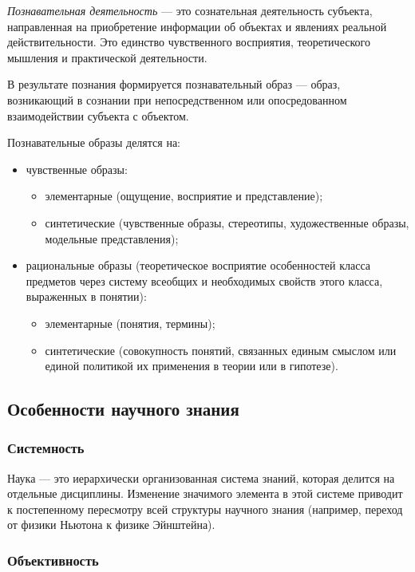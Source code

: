 \textit{Познавательная
деятельность} --- это сознательная деятельность субъекта, направленная на
приобретение информации об объектах и явлениях реальной действительности. Это
единство чувственного восприятия, теоретического мышления и практической
деятельности.  

В результате познания формируется
познавательный образ --- образ, возникающий в сознании при непосредственном или
опосредованном взаимодействии субъекта с объектом.  

Познавательные образы делятся на: 

\begin{itemize}
    \item чувственные образы:
    \begin{itemize}
        \item элементарные (ощущение, восприятие и представление);
        \item синтетические (чувственные образы, стереотипы, художественные образы, модельные представления);
    \end{itemize}
    \item рациональные образы (теоретическое восприятие особенностей класса предметов 
через систему всеобщих и необходимых свойств этого класса, выраженных
в понятии):
    \begin{itemize}
        \item элементарные (понятия, термины);
        \item синтетические (совокупность понятий, связанных 
единым смыслом или единой политикой их применения в теории или в гипотезе).
    \end{itemize}
\end{itemize}

\subsection{Особенности научного знания} 

\subsubsection{Системность} 

Наука --- это иерархически организованная система знаний, которая делится на отдельные дисциплины. Изменение значимого элемента в этой системе приводит к постепенному пересмотру всей структуры научного знания (например, переход от физики Ньютона к физике Эйнштейна).

\subsubsection{Объективность} 

